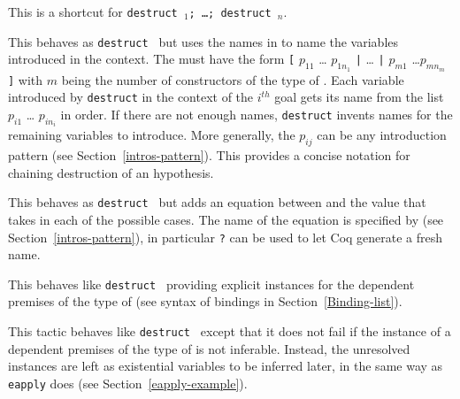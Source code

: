 \begin{Variants}
\item{}

  This is a shortcut for {\tt destruct \term$_1$; \ldots; destruct \term$_n$}.

\item{}

  This behaves as {\tt destruct {\term}} but uses the names in
  {\intropattern} to name the variables introduced in the context.
  The {\intropattern} must have the form {\tt [} $p_{11}$ \ldots
    $p_{1n_1}$ {\tt |} {\ldots} {\tt |} $p_{m1}$ \ldots $p_{mn_m}$
    {\tt ]} with $m$ being the number of constructors of the type of
  {\term}. Each variable introduced by {\tt destruct} in the context
  of the $i^{th}$ goal gets its name from the list $p_{i1}$ \ldots
  $p_{in_i}$ in order. If there are not enough names, {\tt destruct}
  invents names for the remaining variables to introduce. More
  generally, the $p_{ij}$ can be any introduction pattern (see
  Section~\ref{intros-pattern}). This provides a concise notation for
  chaining destruction of an hypothesis.


\item{}

  This behaves as {\tt destruct {\term}} but adds an equation between
  {\term} and the value that {\term} takes in each of the possible
  cases.  The name of the equation is specified by {\namingintropattern}
  (see Section~\ref{intros-pattern}), in particular {\tt ?} can be
  used to let Coq generate a fresh name.

\item{}

  This behaves like \texttt{destruct {\term}} providing explicit
  instances for the dependent premises of the type of {\term} (see
  syntax of bindings in Section~\ref{Binding-list}).

\item{}

  This tactic behaves like \texttt{destruct {\term}} except that it
  does not fail if the instance of a dependent premises of the type of
  {\term} is not inferable. Instead, the unresolved instances are left
  as existential variables to be inferred later, in the same way as
  {\tt eapply} does (see Section~\ref{eapply-example}).


\end{Variants}
